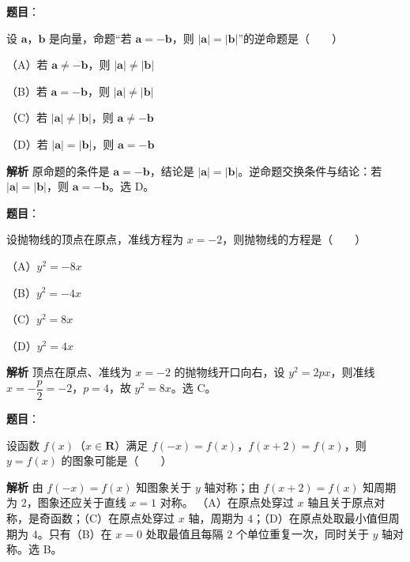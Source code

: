 
\begin{answer}

\textbf{题目}：

设 $\boldsymbol a$，$\boldsymbol b$ 是向量，命题“若 $\boldsymbol a=-\boldsymbol b$，则 $|\boldsymbol a|=|\boldsymbol b|$”的逆命题是\mbox{（　　）}

（A）若 $\boldsymbol a\ne-\boldsymbol b$，则 $|\boldsymbol a|\ne|\boldsymbol b|$

（B）若 $\boldsymbol a=-\boldsymbol b$，则 $|\boldsymbol a|\ne|\boldsymbol b|$

（C）若 $|\boldsymbol a|\ne|\boldsymbol b|$，则 $\boldsymbol a\ne-\boldsymbol b$

（D）若 $|\boldsymbol a|=|\boldsymbol b|$，则 $\boldsymbol a=-\boldsymbol b$

\textbf{解析}
原命题的条件是 $\boldsymbol a=-\boldsymbol b$，结论是 $|\boldsymbol a|=|\boldsymbol b|$。逆命题交换条件与结论：若 $|\boldsymbol a|=|\boldsymbol b|$，则 $\boldsymbol a=-\boldsymbol b$。选 D。


\end{answer}
\begin{answer}

\textbf{题目}：

设抛物线的顶点在原点，准线方程为 $x=-2$，则抛物线的方程是\mbox{（　　）}

（A）$y^2=-8x$

（B）$y^2=-4x$

（C）$y^2=8x$

（D）$y^2=4x$

\textbf{解析}
顶点在原点、准线为 $x=-2$ 的抛物线开口向右，设 $y^2=2px$，则准线 $x=-\dfrac p2=-2$，$p=4$，故 $y^2=8x$。选 C。


\end{answer}
\begin{answer}

\textbf{题目}：

设函数 $f(x)$（$x\in\mathbf R$）满足 $f(-x)=f(x)$，$f(x+2)=f(x)$，则 $y=f(x)$ 的图象可能是\mbox{（　　）}
\nopagebreak[4]
\begin{center}\end{center}
\nopagebreak[4]
\textbf{解析}
由 $f(-x)=f(x)$ 知图象关于 $y$ 轴对称；由 $f(x+2)=f(x)$ 知周期为 $2$，图象还应关于直线 $x=1$ 对称。
（A）在原点处穿过 $x$ 轴且关于原点对称，是奇函数；（C）在原点处穿过 $x$ 轴，周期为 $4$；（D）在原点处取最小值但周期为 $4$。只有（B）在 $x=0$ 处取最值且每隔 $2$ 个单位重复一次，同时关于 $y$ 轴对称。选 B。


\end{answer}
